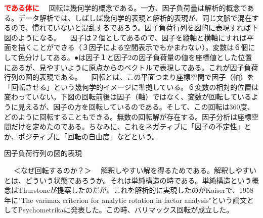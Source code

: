 \documentclass[a4j,11pt,mc]{jreport}
\newcommand{\tr}[1]{\textcolor{red}{\bf#1}} %
\begin{document}
\tr{である体に}
	　回転は幾何学的概念である。一方、因子負荷量は解析的概念である。データ解析では、しばしば幾何学的表現と解析的表現が、同じ文脈で混在するので、慣れていないと混乱するであろう。因子負荷行列を図的に表現すれば下図のようになる。
	　因子は２個としてあるので、因子を縦軸と横軸にすれば平面を描くことができる（３因子による空間表示でもかまわない）。変数は６個にして色分けしてある。●は因子１と因子2の因子負荷量の値を座標値とした位置にあるが、見やすいように原点からのベクトルで表現してある。これが因子負荷行列の図的表現である。
	　回転とは、この平面つまり座標空間で因子（軸）を「回転させる」という幾何学的イメージに準拠している。６変数の相対的位置は変わっていない。下図の回転前後は因子（軸）ではなく、変数が回転しているように見えるが、因子の方を回転しているのである。そして、この回転は360度、どのように回転することもできる。無数の回転解が存在する。因子分析は座標空間だけを定めたのである。ちなみに、これをネガティブに「因子の不定性」とか、ポジティブに「回転の自由度」などという。

	因子負荷行列の図的表現
	　

	　
	＜なぜ回転するのか？＞
	　解釈しやすい解を得るためである。解釈しやすいとは、どういう状態であろうか。それは単純構造の時である。単純構造という概念はThurstoneが提案したのだが、これを解析的に実現したのがKaiserで、1958年に"The varimax criterion for analytic rotation in factor analysis"という論文としてPsychometrikaに発表した。この時、バリマックス回転が成立した。
	　
\end{document}
